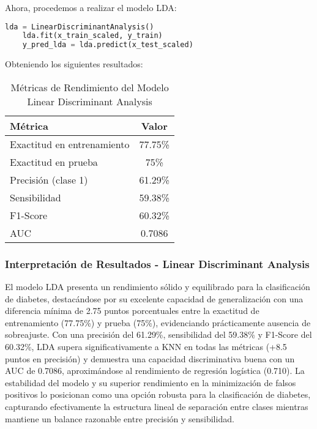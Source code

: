 \documentclass[12pt,a4paper]{article}
\begin{document}
Ahora, procedemos a realizar el modelo LDA:

\begin{lstlisting}[language=Python, frame=single, basicstyle=\ttfamily\small, breaklines=true]
    lda = LinearDiscriminantAnalysis()
    lda.fit(x_train_scaled, y_train)
    y_pred_lda = lda.predict(x_test_scaled)
\end{lstlisting}

Obteniendo los siguientes resultados:

\begin{table}[H]
\centering
\caption{Métricas de Rendimiento del Modelo Linear Discriminant Analysis}\label{tab:lda_resultados}
\begin{tabular}{lc}
\toprule
\textbf{Métrica} & \textbf{Valor} \\
\midrule
Exactitud en entrenamiento & 77.75\% \\
Exactitud en prueba & 75\% \\
Precisión (clase 1) & 61.29\% \\
Sensibilidad & 59.38\% \\
F1-Score & 60.32\% \\
AUC & 0.7086 \\
\bottomrule
\end{tabular}
\end{table}

\subsubsection{Interpretación de Resultados - Linear Discriminant Analysis}

El modelo LDA presenta un rendimiento sólido y equilibrado para la clasificación de diabetes, destacándose por su excelente capacidad de generalización con una diferencia mínima de 2.75 puntos porcentuales entre la exactitud de entrenamiento (77.75\%) y prueba (75\%), evidenciando prácticamente ausencia de sobreajuste. Con una precisión del 61.29\%, sensibilidad del 59.38\% y F1-Score del 60.32\%, LDA supera significativamente a KNN en todas las métricas (+8.5 puntos en precisión) y demuestra una capacidad discriminativa buena con un AUC de 0.7086, aproximándose al rendimiento de regresión logística (0.710). La estabilidad del modelo y su superior rendimiento en la minimización de falsos positivos lo posicionan como una opción robusta para la clasificación de diabetes, capturando efectivamente la estructura lineal de separación entre clases mientras mantiene un balance razonable entre precisión y sensibilidad.
\end{document}
